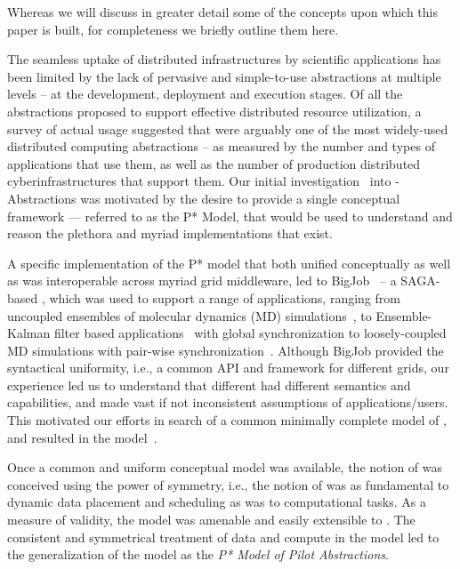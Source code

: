 \documentclass{sig-alternate}
\begin{document}
Whereas we will discuss in greater detail some of the concepts upon which this
paper is built, for completeness we briefly outline them here.

The seamless uptake of distributed infrastructures by scientific
applications has been limited by the lack of pervasive and
simple-to-use abstractions at multiple levels – at the development,
deployment and execution stages. Of all the abstractions proposed to
support effective distributed resource utilization, a survey of actual
usage suggested that \pilotjobs were arguably one of the most
widely-used distributed computing abstractions – as measured by the
number and types of applications that use them, as well as the number
of production distributed cyberinfrastructures that support them.  Our
initial investigation~\cite{Luckow:2008la} into \pilot-Abstractions
was motivated by the desire to provide a single conceptual framework
--- referred to as the P* Model, that would be used to understand and
reason the plethora and myriad \pilotjob implementations that exist.

A specific implementation of the P* model that both unified
conceptually as well as was interoperable across myriad grid
middleware, led to BigJob~\cite{saga_bigjob_condor_cloud} -- a
SAGA-based \pilotjob, which was used to support a range of
applications, ranging from uncoupled ensembles of molecular dynamics
(MD) simulations~\cite{saga_bigjob_condor_cloud}, to Ensemble-Kalman
filter based applications~\cite{gmac09} with global synchronization to
loosely-coupled MD simulations with pair-wise
synchronization~\cite{async_repex11}.  Although BigJob provided the
syntactical uniformity, i.e., a common API and framework for different
grids, our experience led us to understand that different \pilotjobs
had different semantics and capabilities, and made vast if not
inconsistent assumptions of applications/users. This motivated our
efforts in search of a common minimally complete model of \pilotjobs,
and resulted in the \pstar model~\cite{pstar12}.

Once a common and uniform conceptual model was available, the notion
of \pilotdata was conceived using the power of symmetry, i.e., the
notion of \pilotdata was as fundamental to dynamic data placement and
scheduling as \pilotjobs was to computational tasks. As a measure of
validity, the \pstar model was amenable and easily extensible to
\pilotdata.  The consistent and symmetrical treatment of data and
compute in the model led to the generalization of the model as the
{\it P* Model of Pilot Abstractions}.
\end{document}
